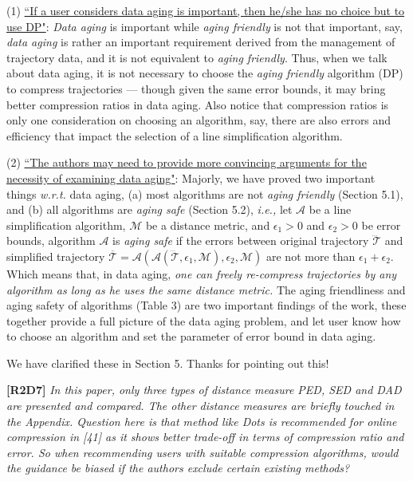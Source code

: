 \documentclass{letter}
\newcommand{\ie}{\emph{i.e.,}\xspace}
\newcommand{\wrt}{\emph{w.r.t.}\xspace}
\begin{document}
{{(1) \underline{``If a user considers data aging is important, then he/she has no choice but to use DP"}: \emph{Data aging} is important while \emph{aging friendly} is not that important, say, \emph{data aging} is rather an important requirement derived from the management of trajectory data, and it is not equivalent to \emph{aging friendly}. Thus, when we talk about data aging, it is not necessary to choose the \emph{aging friendly} algorithm (DP) to compress trajectories --- though given the same error bounds, it may bring better compression ratios in data aging. Also notice that compression ratios is only one consideration on choosing an algorithm, say, there are also errors and efficiency that impact the selection of a line simplification algorithm.

(2) \underline{``The authors may need to provide more convincing arguments for the necessity of examining data aging"}: Majorly, we have proved two important things \wrt data aging, (a) most algorithms are not \emph{aging friendly} (Section 5.1), and (b) all algorithms are \emph{aging safe} (Section 5.2), \ie let $\mathcal{A}$ be a line simplification algorithm,  $\mathcal{M}$ be a distance metric, and $\epsilon_1>0$ and $\epsilon_2>0$ be error bounds, algorithm $\mathcal{A}$ is \emph{aging safe} if the errors between original trajectory $\dddot{\mathcal{T}}$ and simplified trajectory $\overline{\mathcal{T}}=\mathcal{A}(\mathcal{A}(\dddot{\mathcal{T}}, \epsilon_1, \mathcal{M}), \epsilon_2, \mathcal{M})$ are not more than $\epsilon_1+ \epsilon_2$. Which means that, in data aging, \emph{one can freely re-compress trajectories by any algorithm as long as he uses the same distance metric.} The aging friendliness and aging safety of algorithms (Table 3) are two important findings of the work, these together provide a full picture of the data aging problem, and let user know how to choose an algorithm and set the parameter of error bound in data aging. 

We have clarified these in Section 5. Thanks for pointing out this!

\textbf{[R2D7]} \emph{In this paper, only three types of distance measure PED, SED and DAD are presented and compared. The other distance measures are briefly touched in the Appendix. Question here is that method like Dots is recommended for online compression in [41] as it shows better trade-off in terms of compression ratio and error. So when recommending users with suitable compression algorithms, would the guidance be biased if the authors exclude certain existing methods?}

}}
\end{document}
